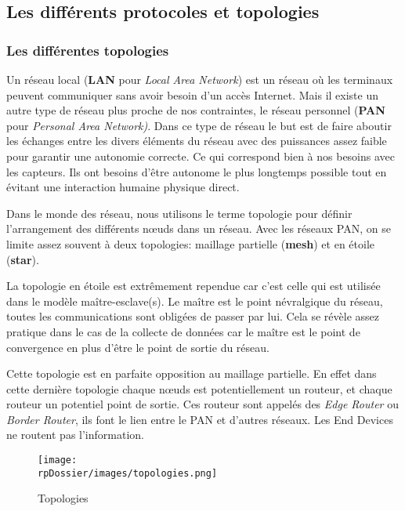 
\subsection{Les différents protocoles et topologies}

\subsubsection{Les différentes topologies}

Un réseau local (\textbf{LAN} pour \textit{Local Area Network}) est un réseau où les terminaux peuvent communiquer sans avoir besoin d'un accès Internet. Mais il existe un autre type de réseau plus proche de nos contraintes, le réseau personnel (\textbf{PAN} pour \textit{Personal Area Network)}. Dans ce type de réseau le but est de faire aboutir les échanges entre les divers éléments du réseau avec des puissances assez faible pour garantir une autonomie correcte. Ce qui correspond bien à nos besoins avec les capteurs. Ils ont besoins d'être autonome le plus longtemps possible tout en évitant une interaction humaine physique direct. 

Dans le monde des réseau, nous utilisons le terme topologie pour définir l'arrangement des différents nœuds dans un réseau. Avec les réseaux PAN, on se limite assez souvent à deux topologies: maillage partielle (\textbf{mesh}) et en étoile (\textbf{star}).

La topologie en étoile est extrêmement rependue car c'est celle qui est utilisée dans le modèle maître-esclave(s). Le maître est le point névralgique du réseau, toutes les communications sont obligées de passer par lui. Cela se révèle assez pratique dans le cas de la collecte de données car le maître est le point de convergence en plus d'être le point de sortie du réseau.

Cette topologie est en parfaite opposition au maillage partielle. En effet dans cette dernière topologie chaque nœuds est potentiellement un routeur, et chaque routeur un potentiel point de sortie. Ces routeur sont appelés des \textit{Edge Router} ou \textit{Border Router}, ils font le lien entre le PAN et d'autres réseaux. Les End Devices ne routent pas l'information.

\begin{figure}[h]
\begin{center}
\texttt{[image: \\rpDossier/images/topologies.png]}
\end{center}
\caption{Topologies}
\label{topologies}
\end{figure}



